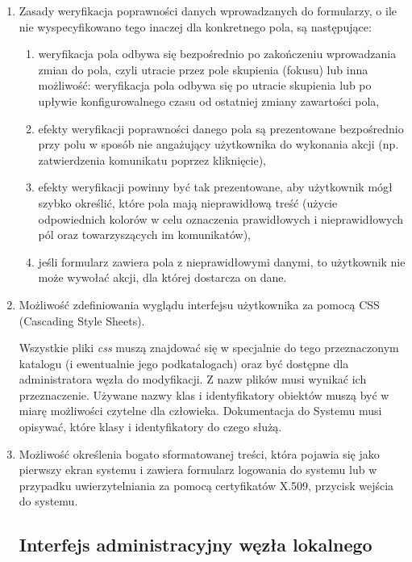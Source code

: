 \documentclass[a4paper]{report}
\begin{document}
\begin{enumerate}
  \item Zasady weryfikacja poprawności danych wprowadzanych do formularzy, o ile
  nie wyspecyfikowano tego inaczej dla konkretnego pola, są następujące:
  \begin{enumerate}
    \item weryfikacja pola odbywa się bezpośrednio po zakończeniu wprowadzania zmian do pola, czyli utracie przez pole skupienia (fokusu)
    lub inna możliwość: weryfikacja pola odbywa się po utracie skupienia lub po upływie konfigurowalnego czasu od ostatniej zmiany zawartości pola,
    \item efekty weryfikacji poprawności danego pola są prezentowane bezpośrednio przy polu w sposób nie angażujący użytkownika do wykonania
    akcji (np. zatwierdzenia komunikatu poprzez kliknięcie),
    \item efekty weryfikacji powinny być tak prezentowane, aby użytkownik mógł szybko określić, które pola mają
    nieprawidłową treść (użycie odpowiednich kolorów w celu oznaczenia prawidłowych i nieprawidłowych pól oraz towarzyszących
    im komunikatów),
    \item jeśli formularz zawiera pola z nieprawidłowymi danymi, to użytkownik nie może wywołać akcji, dla której dostarcza on dane.
  \end{enumerate}

  \item Możliwość zdefiniowania wyglądu interfejsu użytkownika za pomocą CSS (Cascading Style Sheets).

  Wszystkie pliki \emph{css} muszą znajdować się w specjalnie do tego przeznaczonym katalogu (i ewentualnie
  jego podkatalogach) oraz być dostępne dla administratora węzła do modyfikacji. Z nazw plików musi wynikać
  ich przeznaczenie. Używane nazwy klas i identyfikatory obiektów muszą być w miarę możliwości czytelne
  dla człowieka. Dokumentacja do Systemu musi opisywać, które klasy i identyfikatory do czego służą.

  \item Możliwość określenia bogato sformatowanej treści, która pojawia się jako pierwszy ekran systemu
  i zawiera formularz logowania do systemu lub w przypadku uwierzytelniania za pomocą certyfikatów X.509,
  przycisk wejścia do systemu.

\subsection{Interfejs administracyjny węzła lokalnego}


\end{enumerate}
\end{document}
